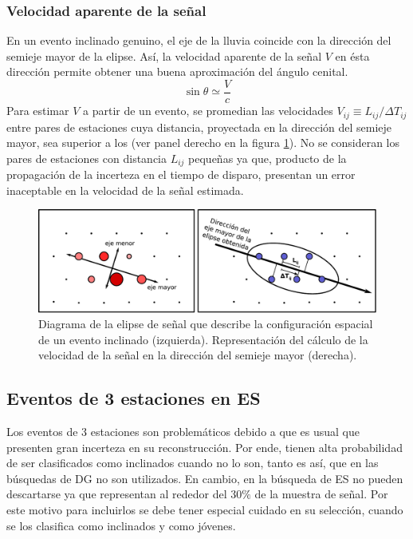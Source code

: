 		\subsubsection{Velocidad aparente de la señal}
		En un evento inclinado genuino, el eje de la lluvia coincide con la dirección del semieje mayor de la elipse.
		Así, la velocidad aparente de la señal $V$ en ésta dirección permite obtener una buena aproximación del ángulo cenital.
		\begin{equation}
		\sin\theta \simeq \frac{V}{c}
		\end{equation}
		Para estimar $V$ a partir de un evento, se promedian las velocidades $V_{ij}\equiv L_{ij}/\Delta T_{ij}$ entre pares de estaciones cuya distancia, proyectada en la dirección del semieje mayor, sea superior a los  (ver panel derecho en la figura \ref{fig:elipse}).
		No se consideran los pares de estaciones con distancia $L_{ij}$ pequeñas ya que, producto de la propagación de la incerteza en el tiempo de disparo, presentan un error inaceptable en la velocidad de la señal estimada.
		\begin{figure}[ht]
		\begin{center}
		\includegraphics[width=1.0\textwidth]{fig/seleccionAuger/elipse.pdf}
		\caption{Diagrama de la elipse de señal que describe la configuración espacial de un evento inclinado (izquierda). Representación del cálculo de la velocidad de la señal en la dirección del semieje mayor (derecha).}
		\label{fig:elipse}
		\end{center}
		\end{figure}
		
		\subsection{Eventos de 3 estaciones en ES}
		\label{sbsc:3StIncl}
		
		Los eventos de 3 estaciones son problemáticos debido a que es usual que presenten gran incerteza en su reconstrucción. 
		Por ende, tienen alta probabilidad de ser clasificados como inclinados cuando no lo son, tanto es así, que en las búsquedas de DG no son utilizados.
		En cambio, en la búsqueda de ES no pueden descartarse ya que representan al rededor del 30$\%$ de la muestra de señal. 
		Por este motivo para incluirlos se debe tener especial cuidado en su selección, cuando se los clasifica como inclinados y como jóvenes.
		
